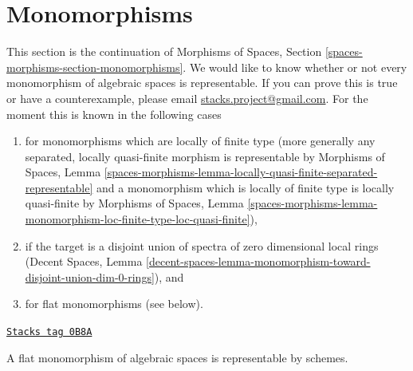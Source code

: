 \section{Monomorphisms}
\label{spaces-more-morphisms-section-monomorphisms}
This section is the continuation of
Morphisms of Spaces, Section \ref{spaces-morphisms-section-monomorphisms}.
We would like to know whether or not every monomorphism of algebraic
spaces is representable. If you can prove this is true or have a
counterexample, please email
\href{mailto:stacks.project@gmail.com}{stacks.project@gmail.com}.
For the moment this is known in the following cases
\begin{enumerate}
\item for monomorphisms which are locally of finite type
(more generally any separated, locally quasi-finite morphism
is representable by Morphisms of Spaces, Lemma
\ref{spaces-morphisms-lemma-locally-quasi-finite-separated-representable}
and a monomorphism which is locally of finite type is
locally quasi-finite by Morphisms of Spaces, Lemma
\ref{spaces-morphisms-lemma-monomorphism-loc-finite-type-loc-quasi-finite}),
\item if the target is a disjoint union of spectra of zero dimensional
local rings (Decent Spaces, Lemma
\ref{decent-spaces-lemma-monomorphism-toward-disjoint-union-dim-0-rings}), and
\item for flat monomorphisms (see below).
\end{enumerate}

\begin{lemma}

\label{spaces-more-morphisms-lemma-flat-case}
\href{https://stacks.math.columbia.edu/tag/0B8A}{\texttt{Stacks tag 0B8A}}

A flat monomorphism of algebraic spaces is representable by schemes.
\end{lemma}


